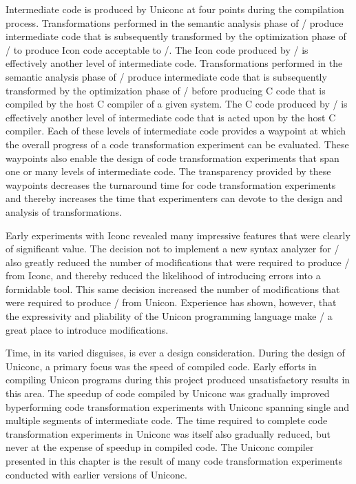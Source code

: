 Intermediate code is produced by Uniconc at four points during the
compilation process. Transformations performed in the semantic
analysis phase of \Ut/ produce intermediate code that is subsequently
transformed by the optimization phase of \Ut/ to produce Icon code
acceptable to \Ic/. The Icon code produced by \Ut/ is effectively
another level of intermediate code. Transformations performed in the
semantic analysis phase of \Ic/ produce intermediate code that is
subsequently transformed by the optimization phase of \Ic/ before
producing C code that is compiled by the host C compiler of a given
system. The C code produced by \Ic/ is effectively another level of
intermediate code that is acted upon by the host C compiler. Each of
these levels of intermediate code provides a waypoint at which the
overall progress of a code transformation experiment can be
evaluated. These waypoints also enable the design of code
transformation experiments that span one or many levels of
intermediate code. The transparency provided by these waypoints
decreases the turnaround time for code transformation experiments and
thereby increases the time that experimenters can devote to the design
and analysis of transformations.

Early experiments with Iconc revealed many impressive features that
were clearly of significant value. The decision not to implement a new
syntax analyzer for \Ic/ also greatly reduced the number of
modifications that were required to produce \Ic/ from Iconc, and
thereby reduced the likelihood of introducing errors into a formidable
tool. This same decision increased the number of modifications that
were required to produce \Ut/ from Unicon.  Experience has shown,
however, that the expressivity and pliability of the Unicon
programming language make \Ut/ a great place to introduce
modifications.

Time, in its varied disguises, is ever a design consideration. During
the design of Uniconc, a primary focus was the speed of compiled
code. Early efforts in compiling Unicon programs during this project
produced unsatisfactory results in this area. The speedup of code
compiled by Uniconc was gradually improved byperforming code
transformation experiments with Uniconc spanning single and multiple
segments of intermediate code. The time required to complete code
transformation experiments in Uniconc was itself also gradually
reduced, but never at the expense of speedup in compiled code. The
Uniconc compiler presented in this chapter is the result of many code
transformation experiments conducted with earlier versions of Uniconc.

